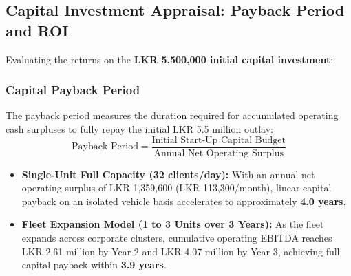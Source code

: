 \subsection{Capital Investment Appraisal: Payback Period and ROI}
\label{subsec:investment_appraisal}

Evaluating the returns on the \textbf{LKR 5,500,000 initial capital investment}:

\subsubsection{Capital Payback Period}
The payback period measures the duration required for accumulated operating cash surpluses to fully repay the initial LKR 5.5 million outlay:
\begin{equation}
    \text{Payback Period} = \frac{\text{Initial Start-Up Capital Budget}}{\text{Annual Net Operating Surplus}}
\end{equation}
\begin{itemize}[leftmargin=1.5em, itemsep=0.15em]
    \item \textbf{Single-Unit Full Capacity (32 clients/day):} With an annual net operating surplus of LKR 1,359,600 (LKR 113,300/month), linear capital payback on an isolated vehicle basis accelerates to approximately \textbf{4.0 years}.
    \item \textbf{Fleet Expansion Model (1 to 3 Units over 3 Years):} As the fleet expands across corporate clusters, cumulative operating EBITDA reaches LKR 2.61 million by Year 2 and LKR 4.07 million by Year 3, achieving full capital payback within \textbf{3.9 years}.
\end{itemize}

